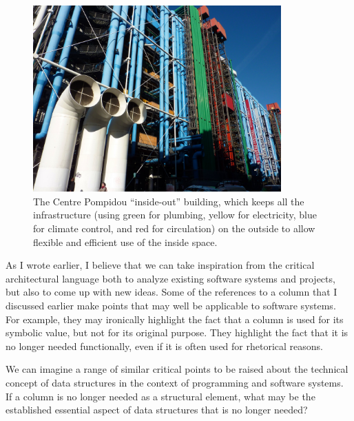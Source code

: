\begin{figure}
\centering
\includegraphics[width=0.85\textwidth]{chapters/fig/pompidou.jpg}\quad
\caption{The Centre Pompidou ``inside-out'' building, which keeps all the infrastructure
(using green for plumbing, yellow for electricity, blue for climate control, and red for
circulation) on the outside to allow flexible and efficient use of the inside space.}
\label{fig:pompidou}
\end{figure}

As I wrote earlier, I believe that we can take inspiration from the critical architectural
language both to analyze existing software systems and projects, but also to come up with
new ideas. Some of the references to a column that I discussed earlier make points that
may well be applicable to software systems. For example, they may ironically highlight the fact
that a column is used for its symbolic value, but not for its original purpose.
They highlight the fact that it is no longer needed functionally, even if it is often used
for rhetorical reasons.

We can imagine a range of similar critical points to be raised about the technical concept
of data structures in the context of programming and software systems. If a column is no longer
needed as a structural element, what may be the established essential aspect of data structures
that is no longer needed?

